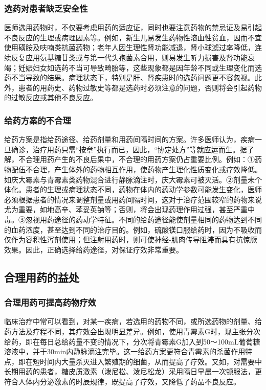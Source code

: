 \subsubsection{选药对患者缺乏安全性}

医师选用药物时，不仅要考虑用药的适应证，同时也要注意药物的禁忌证及易引起不良反应的生理或病理因素等。例如，新生儿易发生药物性溶血性贫血，因而不宜使用磺胺及呋喃类抗菌药物；老年人因生理性肾功能减退，肾小球滤过率降低，连续反复应用氨基糖苷类或与第一代头孢菌素合用，则易发生听力损害及肾功能衰竭；妊娠妇女如选药不当可导致畸胎等，这些现象都是因年龄不同或生理变化而选药不当导致的结果。病理状态下，特别是肝、肾疾患时的选药问题更不容忽视。此外，患者的用药史、药物过敏史等都是选药时必须注意的问题，否则将会引起药物的过敏反应或其他不良反应。

\subsubsection{给药方案的不合理}

给药方案是指给药途径、给药剂量和用药间隔时间的方案。许多医师认为，疾病一旦确诊，治疗用药只需“按章”执行而已，因此，“协定处方”等就应运而生。据了解，不合理用药产生的不良后果中，不合理的用药方案仍占重要比例。例如：①药物配伍不合理，产生体外的药物相互作用，使药物产生理化性质变化或疗效降低。如庆大霉素与青霉素类药物混合进行静脉滴注时，庆大霉素可被灭活。②剂量未个体化。患者的生理或病理状态不同，药物在体内的药动学参数可能发生变化，医师必须根据患者的情况来调整剂量或用药间隔时间，这对于治疗范围较窄的药物来说尤为重要，如地高辛、苯妥英钠等；否则，将会出现药理作用过强，甚至严重中毒。③忽视用药途径的药动学特征。不同的给药途径能使剂量相同的药物达到不同的血药浓度，甚至达到不同的治疗目的。例如，硫酸镁口服给药时，因为不吸收而仅作为容积性泻剂使用；但注射用药时，则可使神经-肌肉传导阻滞而具有抗惊厥效果。因此，正确选择给药途径，对保证疗效非常重要。

\subsection{合理用药的益处}

\subsubsection{合理用药可提高药物疗效}

临床治疗中常可以看到，对某一疾病，若选用的药物不同，或所选药物的剂量、给药方法及疗程不同，其疗效会出现明显差异。例如，使用青霉素G时，现主张分次给药，即在每日总给药量不变的情况下，分次将青霉素G加入到50～100mL葡萄糖溶液中，并于30min内静脉滴注完毕。这一给药方案更符合青霉素的杀菌作用特点，即在短时间内大量杀灭进入繁殖期的细菌，从而提高了疗效。又如，对需要中长期用药的患者，糖皮质激素（泼尼松、泼尼松龙）采用隔日早晨一次顿服法，更符合人体内分泌激素的时辰规律，既提高了疗效，又降低了药品不良反应。

